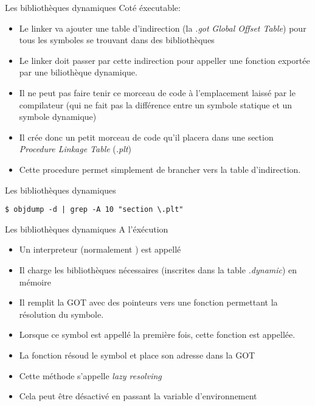\begin{frame}[fragile=singleslide]{Les bibliothèques dynamiques}
  Coté éxecutable:
  \begin{itemize}
  \item Le  linker va ajouter une table  d'indirection (la \emph{.got}
    \emph{Global  Offset Table})  pour tous  les symboles  se trouvant
    dans des bibliothèques
  \item Le linker doit passer  par cette indirection pour appeller une
    fonction exportée par une biliothèque dynamique.
  \item Il ne peut pas faire  tenir ce morceau de code à l'emplacement
    laissé par le compilateur (qui  ne fait pas la différence entre un
    symbole statique et un symbole dynamique)
  \item Il crée  donc un petit morceau de code  qu'il placera dans une
    section \emph{Procedure Linkage Table} (\emph{.plt})
  \item Cette  procedure permet simplement  de brancher vers  la table
    d'indirection.
  \end{itemize}
\end{frame}

\begin{frame}[fragile=singleslide]{Les bibliothèques dynamiques}
  \begin{center}
\end{center}
\begin{lstlisting}
$ objdump -d | grep -A 10 "section \.plt"
    \end{lstlisting}
\end{frame}

\begin{frame}[fragile=singleslide]{Les bibliothèques dynamiques}
  A l'éxécution
  \begin{itemize}
  \item Un interpreteur (normalement ) est appellé
  \item  Il charge  les bibliothèques  nécessaires (inscrites  dans la
    table \emph{.dynamic}) en mémoire
  \item  Il  remplit la  GOT  avec  des  pointeurs vers  une  fonction
    permettant la résolution du symbole.
  \item Lorsque ce symbol est appellé la première fois, cette fonction
    est appellée.
  \item La fonction résoud le symbol et place son adresse dans la GOT
  \item Cette méthode s'appelle \emph{lazy resolving}
  \item   Cela   peut   être   désactivé  en   passant   la   variable
    d'environnement 
  \end{itemize}
\end{frame}

